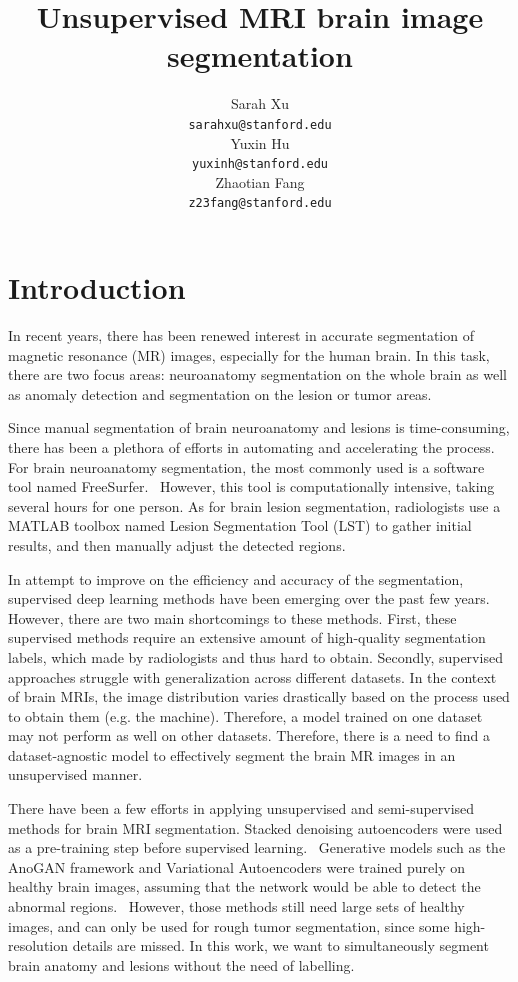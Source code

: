 \documentclass{article}
\title{Unsupervised MRI brain image segmentation}
\author{
  Sarah Xu \\
  \texttt{sarahxu@stanford.edu} \\
   \And
 Yuxin Hu \\
  \texttt{yuxinh@stanford.edu} \\
  \And
 Zhaotian Fang \\
  \texttt{z23fang@stanford.edu} \\
}
\begin{document}
\maketitle

\section{Introduction}
In recent years, there has been renewed interest in accurate segmentation of magnetic resonance (MR) images, especially for the human brain. In this task, there are two focus areas: neuroanatomy segmentation on the whole brain as well as anomaly detection and segmentation on the lesion or tumor areas. 

Since manual segmentation of brain neuroanatomy and lesions is time-consuming, there has been a plethora of efforts in automating and accelerating the process. For brain neuroanatomy segmentation, the most commonly used is a software tool named FreeSurfer.~\cite{freesurfer} However, this tool is computationally intensive, taking several hours for one person. As for brain lesion segmentation, radiologists use a MATLAB toolbox named Lesion Segmentation Tool (LST) to gather initial results, and then manually adjust the detected regions.~\cite{schmidt2013lst}

In attempt to improve on the efficiency and accuracy of the segmentation, supervised deep learning methods have been emerging over the past few years.~\cite{badrinarayanan2017segnet, su2015autoencoder, li2018hdensenet, wachinger2018deepnat} However, there are two main shortcomings to these methods. First, these supervised methods require an extensive amount of high-quality segmentation labels, which made by radiologists and thus hard to obtain. Secondly, supervised approaches struggle with generalization across different datasets. In the context of brain MRIs, the image distribution varies drastically based on the process used to obtain them (e.g. the machine). Therefore, a model trained on one dataset may not perform as well on other datasets. Therefore, there is a need to find a dataset-agnostic model to effectively segment the brain MR images in an unsupervised manner.

There have been a few efforts in applying unsupervised and semi-supervised methods for brain MRI segmentation. Stacked denoising autoencoders were used as a pre-training step before supervised learning.~\cite{su2015autoencoder} Generative models such as the AnoGAN framework and Variational Autoencoders were trained purely on healthy brain images, assuming that the network would be able to detect the abnormal regions.~\cite{an2015vae, Januszewsk2019cyclegan} However, those methods still need large sets of healthy images, and can only be used for rough tumor segmentation, since some high-resolution details are missed. In this work, we want to simultaneously segment brain anatomy and lesions without the need of labelling.
\end{document}
